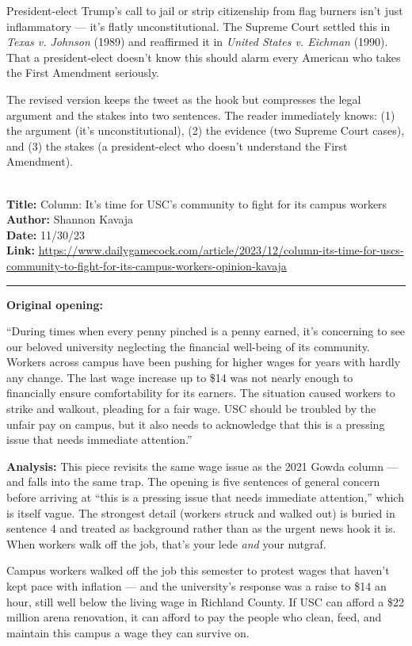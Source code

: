 \documentclass[12pt]{article}
\newcounter{examplenum}
\newcommand{\totalexamples}{10}
\newcommand{\exampleheader}[4]{%
    \newpage
    \stepcounter{examplenum}%
    \noindent{\large\bfseries\color{garnet} Example \theexamplenum\ of \totalexamples}\\[6pt]
    \textbf{Title:} #1\\
    \textbf{Author:} #2\\
    \textbf{Date:} #3\\
    \textbf{Link:} \url{#4}\\[4pt]
    \noindent\rule{\textwidth}{0.4pt}
    \vspace{6pt}
}
\begin{document}
\begin{seasonbox}
President-elect Trump's call to jail or strip citizenship from flag burners isn't just inflammatory --- it's flatly unconstitutional. The Supreme Court settled this in \textit{Texas v. Johnson} (1989) and reaffirmed it in \textit{United States v. Eichman} (1990). That a president-elect doesn't know this should alarm every American who takes the First Amendment seriously.
\end{seasonbox}

The revised version keeps the tweet as the hook but compresses the legal argument and the stakes into two sentences. The reader immediately knows: (1) the argument (it's unconstitutional), (2) the evidence (two Supreme Court cases), and (3) the stakes (a president-elect who doesn't understand the First Amendment).

\exampleheader{Column: It's time for USC's community to fight for its campus workers}{Shannon Kavaja}{11/30/23}{https://www.dailygamecock.com/article/2023/12/column-its-time-for-uscs-community-to-fight-for-its-campus-workers-opinion-kavaja}

\begin{promptbox}
\textbf{Original opening:}

``During times when every penny pinched is a penny earned, it's concerning to see our beloved university neglecting the financial well-being of its community. Workers across campus have been pushing for higher wages for years with hardly any change. The last wage increase up to \$14 was not nearly enough to financially ensure comfortability for its earners. The situation caused workers to strike and walkout, pleading for a fair wage. USC should be troubled by the unfair pay on campus, but it also needs to acknowledge that this is a pressing issue that needs immediate attention.''
\end{promptbox}

\textbf{Analysis:} This piece revisits the same wage issue as the 2021 Gowda column --- and falls into the same trap. The opening is five sentences of general concern before arriving at ``this is a pressing issue that needs immediate attention,'' which is itself vague. The strongest detail (workers struck and walked out) is buried in sentence 4 and treated as background rather than as the urgent news hook it is. When workers walk off the job, that's your lede \textit{and} your nutgraf.

\begin{seasonbox}
Campus workers walked off the job this semester to protest wages that haven't kept pace with inflation --- and the university's response was a raise to \$14 an hour, still well below the living wage in Richland County. If USC can afford a \$22 million arena renovation, it can afford to pay the people who clean, feed, and maintain this campus a wage they can survive on.
\end{seasonbox}
\end{document}
